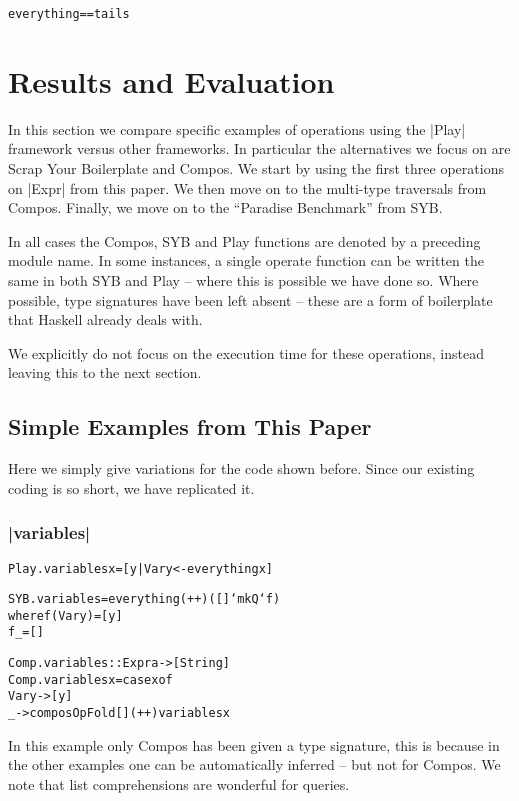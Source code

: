 \documentclass[preprint]{sigplanconf}
\newenvironment{code}{\begin{alltt}\small}{\end{alltt}}
\begin{document}
\begin{code}
everything == tails
\end{code}



\section{Results and Evaluation}
\label{sec:results}

In this section we compare specific examples of operations using the |Play| framework versus other frameworks. In particular the alternatives we focus on are Scrap Your Boilerplate and Compos. We start by using the first three operations on |Expr| from this paper. We then move on to the multi-type traversals from Compos. Finally, we move on to the ``Paradise Benchmark'' from SYB.

In all cases the Compos, SYB and Play functions are denoted by a preceding module name. In some instances, a single operate function can be written the same in both SYB and Play -- where this is possible we have done so. Where possible, type signatures have been left absent -- these are a form of boilerplate that Haskell already deals with.

We explicitly do not focus on the execution time for these operations, instead leaving this to the next section.

\subsection{Simple Examples from This Paper}

Here we simply give variations for the code shown before. Since our existing coding is so short, we have replicated it.

\subsubsection{|variables|}

\begin{code}
Play.variables x = [y | Var y <- everything x]

SYB.variables = everything (++) ([] `mkQ` f)
    where  f (Var y)  = [y]
           f _        = []

Comp.variables :: Expr a -> [String]
Comp.variables x = case x of
    Var y -> [y]
    _ -> composOpFold [] (++) variables x
\end{code}

In this example only Compos has been given a type signature, this is because in the other examples one can be automatically inferred -- but not for Compos. We note that list comprehensions are wonderful for queries.
\end{document}
